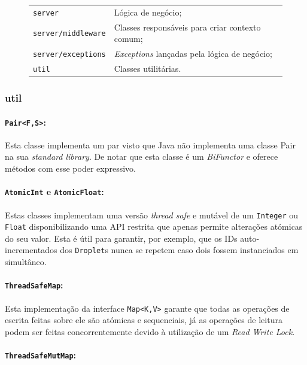 \documentclass[a4paper]{article}
\begin{document}
\begin{figure}[H]
\centering
    \begin{tabular}{ll}
        \texttt{server}            & Lógica de negócio;\\
        \texttt{server/middleware} & Classes responsáveis para criar contexto comum;\\
        \texttt{server/exceptions} & \textit{Exceptions} lançadas pela lógica de negócio;\\
        \texttt{util}              & Classes utilitárias.
    \end{tabular}
\end{figure}

\subsubsection{util}
\paragraph{\texttt{Pair<F,S>}:}

Esta classe implementa um par visto que Java não implementa uma classe Pair na sua \textit{standard library}. De notar que esta classe é um \textit{BiFunctor} e oferece métodos com esse poder expressivo. 

\paragraph{\texttt{AtomicInt} e \texttt{AtomicFloat}:}

Estas classes implementam uma versão \textit{thread safe} e mutável de um \texttt{Integer} ou \texttt{Float} disponibilizando uma API restrita que apenas permite alterações atómicas do seu valor. Esta é útil para garantir, por exemplo,  que os IDs auto-incrementados dos \texttt{Droplet}s nunca se repetem  caso dois fossem instanciados em simultâneo.

\paragraph{\texttt{ThreadSafeMap}:}

Esta implementação da interface \texttt{Map<K,V>} garante que todas as operações de escrita feitas sobre ele são atómicas e sequenciais, já as operações de leitura podem ser feitas concorrentemente devido à utilização de um \textit{Read Write Lock}.

\paragraph{\texttt{ThreadSafeMutMap}:}
\end{document}
